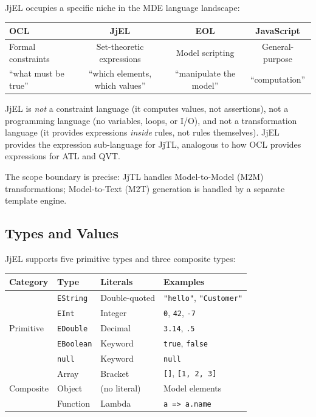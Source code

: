\documentclass[11pt,a4paper]{article}
\newcommand{\jjel}{\textsf{JjEL}}
\newcommand{\jjtl}{\textsf{JjTL}}
\begin{document}
\jjel{} occupies a specific niche in the MDE language landscape:

\begin{center}
\begin{tabular}{@{}lccc@{}}
\toprule
\textbf{OCL} & \textbf{\jjel{}} & \textbf{EOL} & \textbf{JavaScript} \\
\midrule
Formal constraints & Set-theoretic expressions & Model scripting & General-purpose \\
``what must be true'' & ``which elements, which values'' & ``manipulate the model'' & ``computation'' \\
\bottomrule
\end{tabular}
\end{center}

\jjel{} is \emph{not} a constraint language (it computes values, not assertions), not a programming language (no variables, loops, or I/O), and not a transformation language (it provides expressions \emph{inside} rules, not rules themselves). \jjel{} provides the expression sub-language for \jjtl{}, analogous to how OCL provides expressions for ATL and QVT.

The scope boundary is precise: \jjtl{} handles Model-to-Model (M2M) transformations; Model-to-Text (M2T) generation is handled by a separate template engine.

\subsection{Types and Values}

\jjel{} supports five primitive types and three composite types:

\begin{center}
\begin{tabular}{@{}llll@{}}
\toprule
\textbf{Category} & \textbf{Type} & \textbf{Literals} & \textbf{Examples} \\
\midrule
\multirow{5}{*}{Primitive} & \texttt{EString} & Double-quoted & \texttt{"hello"}, \texttt{"Customer"} \\
& \texttt{EInt} & Integer & \texttt{0}, \texttt{42}, \texttt{-7} \\
& \texttt{EDouble} & Decimal & \texttt{3.14}, \texttt{.5} \\
& \texttt{EBoolean} & Keyword & \texttt{true}, \texttt{false} \\
& \texttt{null} & Keyword & \texttt{null} \\
\midrule
\multirow{3}{*}{Composite} & Array & Bracket & \texttt{[]}, \texttt{[1, 2, 3]} \\
& Object & (no literal) & Model elements \\
& Function & Lambda & \texttt{a => a.name} \\
\bottomrule
\end{tabular}
\end{center}
\end{document}
